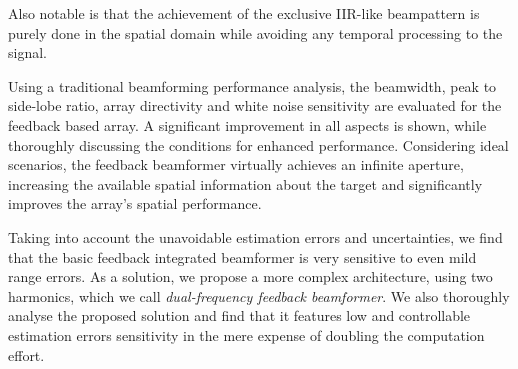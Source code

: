 Also notable is that the achievement of the exclusive IIR-like beampattern is purely done in the spatial domain while avoiding any temporal processing to the signal.
\par 
Using a traditional beamforming performance analysis, the beamwidth, peak to side-lobe ratio, array directivity and white noise sensitivity are evaluated for the feedback based array.
A significant improvement in all aspects is shown, while thoroughly discussing the conditions for enhanced performance.
Considering ideal scenarios, the feedback beamformer virtually achieves an infinite aperture, increasing the available spatial information about the target and significantly improves the array's spatial performance.
\par
Taking into account the unavoidable estimation errors and uncertainties, we find that the basic feedback integrated beamformer is very sensitive to even mild range errors.
As a solution, we propose a more complex architecture, using two harmonics, which we call \emph{dual-frequency feedback beamformer}.
We also thoroughly analyse the proposed solution and find that it features low and controllable estimation errors sensitivity in the mere expense of doubling the computation effort.